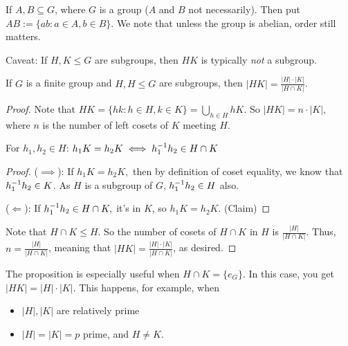 \documentclass[notes.tex]{subfiles}
\begin{document}

\begin{defn}
	If $A, B \subseteq G$, where $G$ is a group ($A$ and $B$ not necessarily). Then put $AB := \{ab : a\in A, b\in B\}$.
	We note that unless the group is abelian, order still matters.

	Caveat: If $H, K\le G$ are subgroups, then $HK$ is typically \emph{not} a subgroup.
\end{defn}

\begin{proposition}
	If $G$ is a finite group and $H, H\le G$ are subgroups, then $|HK| = \frac{|H|\cdot |K|}{|H\cap K|}$.
\end{proposition}
\begin{proof}
	Note that $HK = \{hk: h\in H, k\in K\} = \bigcup_{h\in H}hK$.
	So $|HK| = n\cdot |K|,$ where $n$ is the number of left cosets of $K$ meeting $H.$

	\begin{claim}
		For $h_1, h_2\in H$: $h_1K = h_2K \iff {h}^{-1}_1h_2 \in H\cap K$
	\end{claim}
	\begin{proof}
		($\implies$): If $h_1K = h_2K,$ then by definition of coset equality, we know that ${h}^{-1}_1h_2\in K$. As $H$ is a subgroup of $G$, ${h}^{-1}_1h_2\in H$ also.

		($\Longleftarrow$): If ${h}^{-1}_1h_2\in H\cap K,$ it's in $K$, so $h_1K = h_2K$.
		\qedhere(Claim)
	\end{proof}
	Note that $H\cap K\le H$. So the number of cosets of $H\cap K$ in $H$ is $\frac{|H|}{|H\cap K|}$.
	Thus, $n = \frac{|H|}{|H\cap K|}$, meaning that $|HK| = \frac{|H|\cdot |K|}{|H\cap K|}$, as desired.
\end{proof}

\begin{remark}
	The proposition is especially useful when $H\cap K = \{e_G\}$. In this case, you get $|HK| = |H|\cdot|K|$.
	This happens, for example, when
	\begin{itemize}
		\item $|H|, |K|$ are relatively prime
		\item $|H| = |K| = p$ prime, and $H\ne K$.
	\end{itemize}
\end{remark}
\end{document}
